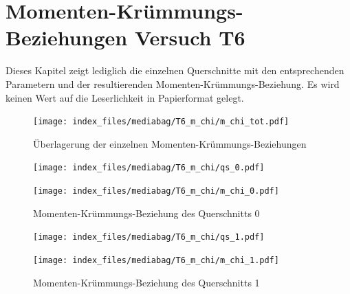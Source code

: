 \documentclass[
  11pt,
  letterpaper,
]{scrreprt}
\begin{document}
\cleardoublepage
{}
{}
\appendix

\chapter{Momenten-Krümmungs-Beziehungen Versuch
T6}\label{momenten-kruxfcmmungs-beziehungen-versuch-t6}


Dieses Kapitel zeigt lediglich die einzelnen Querschnitte mit den
entsprechenden Parametern und der resultierenden
Momenten-Krümmungs-Beziehung. Es wird keinen Wert auf die Leserlichkeit
in Papierformat gelegt.

\begin{figure}[H]

{\centering \texttt{[image: index\_files/mediabag/T6\_m\_chi/m\_chi\_tot.pdf]}

}

\caption{Überlagerung der einzelnen Momenten-Krümmungs-Beziehungen}

\end{figure}%

\begin{figure}[H]

\begin{minipage}{0.50\linewidth}
\texttt{[image: index\_files/mediabag/T6\_m\_chi/qs\_0.pdf]}\end{minipage}%
%
\begin{minipage}{0.50\linewidth}
\texttt{[image: index\_files/mediabag/T6\_m\_chi/m\_chi\_0.pdf]}\end{minipage}%

\caption{\label{fig-mchi_anhang}Momenten-Krümmungs-Beziehung des
Querschnitts 0}

\end{figure}%

\begin{figure}[H]

\begin{minipage}{0.50\linewidth}
\texttt{[image: index\_files/mediabag/T6\_m\_chi/qs\_1.pdf]}\end{minipage}%
%
\begin{minipage}{0.50\linewidth}
\texttt{[image: index\_files/mediabag/T6\_m\_chi/m\_chi\_1.pdf]}\end{minipage}%

\caption{\label{fig-mchi_anhang}Momenten-Krümmungs-Beziehung des
Querschnitts 1}

\end{figure}%
\end{document}
